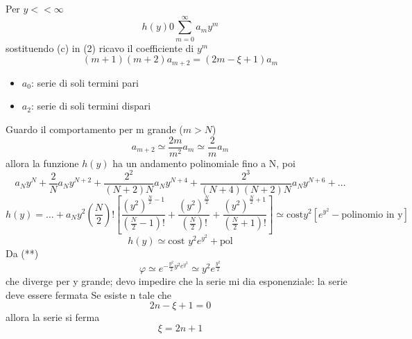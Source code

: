 \begin{itemize}
    Per \(y << \infty\)
    \begin{equation*}
        h(y) 0 \sum_{m=0}^\infty a_m y^m \tag{c}
    \end{equation*}
    sostituendo (c) in (2) ricavo il coefficiente di \(y^m\)
    \begin{equation*}
        (m+1)(m+2) a_{m+2} = (2m - \xi +1)a_m \tag{3}
    \end{equation*}
    \begin{itemize}
        \item \(a_0\): serie di soli termini pari
        \item \(a_2\): serie di soli termini dispari
    \end{itemize}
    Guardo il comportamento per m grande (\(m>N\))
    \begin{equation*}
        a_{m+2} \simeq \frac{2m}{m^2} a_m \simeq \frac{2}{m}a_m
    \end{equation*}
    allora la funzione \(h(y)\) ha un andamento polinomiale fino a N, poi
    \begin{equation*}
        a_Ny^N + \frac{2}{N} a_N y^{N+2} + \frac{2^2}{(N+2)N}a_N y^{N+4} + \frac{2^3}{(N+4)(N+2)N}a_N y^{N+6} + \dots 
    \end{equation*}
    \begin{equation*}
        h(y) = \dots + a_N y^2 \left(\frac{N}{2}\right)! \left[\frac{{(y^2)}^{\frac{N}{2}-1}}{\left(\frac{N}{2}-1\right)!} + \frac{{(y^2)}^{\frac{N}{2}}}{\left(\frac{N}{2}\right)!} + \frac{{(y^2)}^{\frac{N}{2}+1}}{\left(\frac{N}{2}+1\right)!}\right] \simeq \text{cost} y^2 [e^{y^2} - \text{polinomio in y}]         
    \end{equation*}
    \begin{equation*}
        h(y) \simeq \text{cost } y^2 e^{y^2} + \text{pol}
    \end{equation*}
    Da (**)
    \begin{equation*}
        \varphi \simeq e^{-\frac{y^2}{2}y^2e^{y^2}} \simeq y^2 e^{\frac{y^2}{2}}
    \end{equation*}
    che diverge per y grande; devo impedire che la serie mi dia esponenziale: la serie deve essere fermata \newline
    Se esiste n tale che 
    \begin{equation*}
        2n - \xi + 1 = 0 
    \end{equation*}
    allora la serie si ferma
    \begin{equation*}
        \xi = 2n + 1 \tag{d}
    \end{equation*}

\end{itemize}
